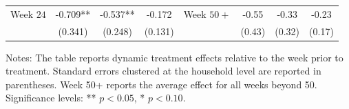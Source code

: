\begin{table}[htbp]
\begin{tabular}{lccc lccc}
Week $24$ & -0.709** & -0.537** & -0.172 & Week $50+$ & -0.55 & -0.33 & -0.23 \\
          & (0.341)  & (0.248)  & (0.131) &            & (0.43) & (0.32) & (0.17) \\

\bottomrule
\end{tabular}

\vspace{0.3cm}
\footnotesize
Notes: The table reports dynamic treatment effects relative to the week prior to treatment. Standard errors clustered at the household level are reported in parentheses. Week 50+ reports the average effect for all weeks beyond 50. Significance levels: ** $p<0.05$, * $p<0.10$.

\end{table}
